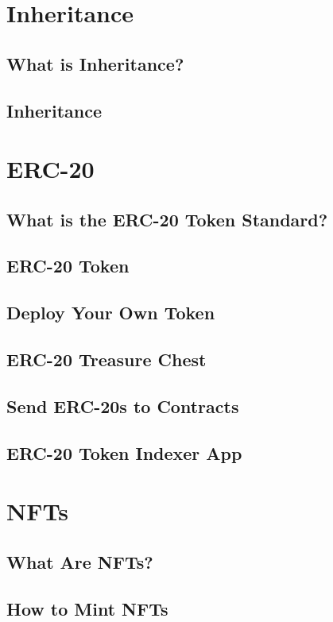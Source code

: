 \documentclass[a4paper, oneside]{book}
\begin{document}
\section{Inheritance}
\subsection{What is Inheritance?}
\subsection{Inheritance}

\section{ERC-20}
\subsection{What is the ERC-20 Token Standard?}
\subsection{ERC-20 Token}
\subsection{Deploy Your Own Token}
\subsection{ERC-20 Treasure Chest}
\subsection{Send ERC-20s to Contracts}
\subsection{ERC-20 Token Indexer App}

\newpage

\section{NFTs}
\subsection{What Are NFTs?}
\subsection{How to Mint NFTs}
\end{document}
